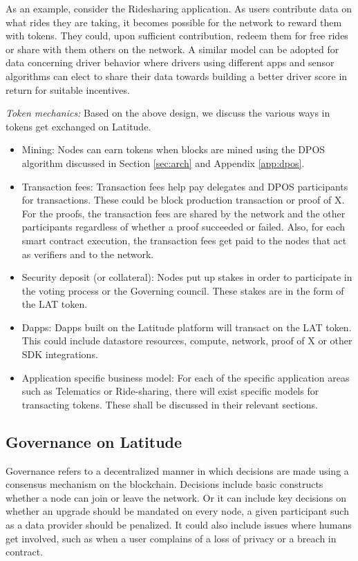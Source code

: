 As an example, consider the Ridesharing application. As users contribute data on what rides they are taking, it becomes
possible for the network to reward them with tokens. They could, upon sufficient contribution, redeem them for free
rides or share with them others on the network. A similar model can be adopted for data concerning driver behavior where
drivers using different apps and sensor algorithms can elect to share their data towards building a better driver score
in return for suitable incentives.

\noindent
{\em Token mechanics:} Based on the above design, we discuss the various ways in tokens get exchanged on Latitude.
\begin{itemize}
    \item Mining: Nodes can earn tokens when blocks are mined using the DPOS algorithm discussed in Section
        \ref{sec:arch} and Appendix \ref{app:dpos}.
    \item Transaction fees: Transaction fees help pay delegates and DPOS participants for transactions. These could be
        block production transaction or proof of X. For the proofs, the transaction fees are shared by the network and
        the other participants regardless of whether a proof succeeded or failed. Also, for each smart contract
        execution, the transaction fees get paid to the nodes that act as verifiers and to the network.
    \item Security deposit (or collateral): Nodes put up stakes in order to participate in the voting process or the
        Governing council. These stakes are in the form of the LAT token.
    \item Dapps: Dapps built on the Latitude platform will transact on the LAT token. This could include datastore
        resources, compute, network, proof of X or other SDK integrations.
    \item Application specific business model: For each of the specific application areas such as Telematics or
        Ride-sharing, there will exist specific models for transacting tokens. These shall be discussed in their
        relevant sections.
\end{itemize}

\subsection{Governance on Latitude}

Governance refers to a decentralized manner in which decisions are made using a consensus mechanism on the blockchain.
Decisions include basic constructs whether a node can join or leave the network. Or it can include key decisions on
whether an upgrade should be mandated on every node, a given participant such as a data provider should be penalized. It
could also include issues where humans get involved, such as when a user complains of a loss of privacy or a breach in
contract.

